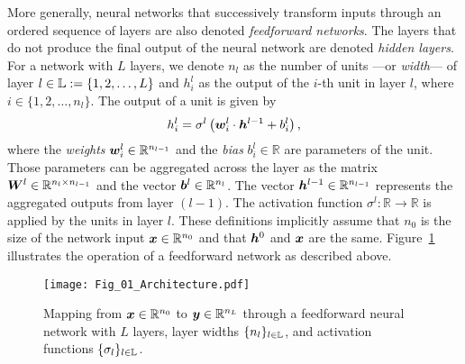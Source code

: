 More generally, neural networks that successively transform inputs through an ordered sequence of layers are also denoted \emph{feedforward networks}. 
The layers that do not produce the final output of the neural network are denoted \emph{hidden layers}. 
For a network with $L$ layers, 
we denote $n_l$ as the number of units ---or \emph{width}--- of layer $l \in {\mathbb{L}} := \{1, 2, \ldots, L\}$ and $h_i^l$ as the output of the $i$-th unit in layer $l$, where $i \in \{1, 2, \ldots, n_l\}$. The output of a unit is given by
\begin{equation} \label{eq:single-neuron}
h_i^l = \sigma^l\left({\bm{w}}^l_i \cdot {\bm{h}}^{l-1} + b^l_i\right),
\end{equation}
where the \emph{weights} ${\bm{w}}^l_i \in \mathbb{R}^{n_{l-1}}$ and the \emph{bias} $b^l_i \in \mathbb{R}$ are parameters of the unit. %
Those parameters can be aggregated across the layer as the matrix ${\bm{W}}^l \in \mathbb{R}^{n_l \times n_{l-1}}$ and the vector ${\bm{b}}^l \in \mathbb{R}^{n_l}$. 
The vector ${\bm{h}}^{l-1} \in \mathbb{R}^{n_{l-1}}$ represents the aggregated outputs from layer $(l-1)$. 
The activation function $\sigma^l : \mathbb{R} \rightarrow \mathbb{R}$ is applied by the units in layer $l$. 
These definitions implicitly assume that $n_0$ is the size of the network input ${\bm{x}} \in \mathbb{R}^{n_0}$ and that ${\bm{h}}^0$ and ${\bm{x}}$ are the same. %
Figure~\ref{fig:ins_outs} illustrates the operation of a feedforward network as described above. 

\begin{figure}
    \centering
    \texttt{[image: Fig\_01\_Architecture.pdf]}
    \caption{Mapping from ${\bm{x}} \in \mathbb{R}^{n_0}$ to ${\bm{y}} \in \mathbb{R}^{n_L}$ through a feedforward neural network with $L$ layers, layer widths $\{ n_l \}_{l \in {\mathbb{L}}}$, and activation functions $\{ \sigma_l \}_{l \in {\mathbb{L}}}$.}
    \label{fig:ins_outs}
\end{figure}

